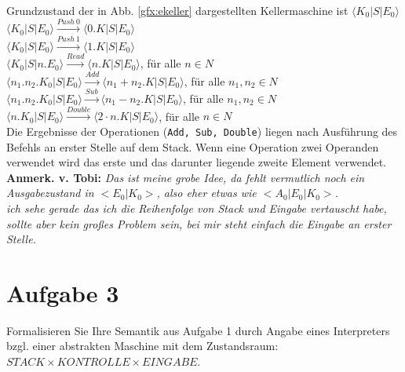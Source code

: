 \documentclass[ngerman,a4paper]{report}
\begin{document}
Grundzustand der in Abb. \ref{gfx:ekeller} dargestellten Kellermaschine ist $\langle K_0|S|E_0\rangle$\\
$\langle K_0|S|E_0\rangle\xrightarrow{Push\ 0} \langle 0.K|S|E_0\rangle$\\
$\langle K_0|S|E_0\rangle\xrightarrow{Push\ 1} \langle 1.K|S|E_0\rangle$\\
$\langle K_0|S|n.E_0\rangle\xrightarrow{Read} \langle n.K|S|E_0\rangle$, für alle $n\in N$\\
$\langle n_1.n_2.K_0|S|E_0\rangle\xrightarrow{Add} \langle n_1+n_2.K|S|E_0\rangle$, für alle $n_1,n_2\in N$\\
$\langle n_1.n_2.K_0|S|E_0\rangle\xrightarrow{Sub} \langle n_1-n_2.K|S|E_0\rangle$, für alle $n_1,n_2\in N$\\
$\langle n.K_0|S|E_0\rangle\xrightarrow{Double} \langle 2\cdot n.K|S|E_0\rangle$, für alle $n\in N$\\

Die Ergebnisse der Operationen (\lstinline!Add, Sub, Double!) liegen nach Ausführung des Befehls an erster Stelle auf dem Stack. Wenn eine Operation zwei Operanden verwendet wird das erste und das darunter liegende zweite Element verwendet.\\
\textbf{Anmerk. v. Tobi:} \emph{Das ist meine grobe Idee, da fehlt vermutlich noch ein Ausgabezustand in $<E_0|K_0>$, also eher etwas wie $<A_0|E_0|K_0>$.\\ ich sehe gerade das ich die Reihenfolge von Stack und Eingabe vertauscht habe, sollte aber kein großes Problem sein, bei mir steht einfach die Eingabe an erster Stelle.}\\
\section*{Aufgabe 3}
Formalisieren Sie Ihre Semantik aus Aufgabe 1 durch Angabe eines Interpreters bzgl. einer abstrakten Maschine mit dem Zustandsraum: $STACK \times KONTROLLE \times EINGABE$.\\
\end{document}
